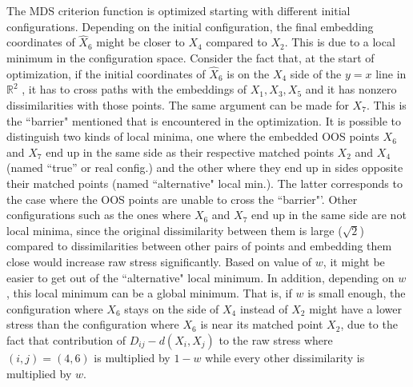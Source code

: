 \documentclass[12pt,oneside,final]{thesis}\usepackage[]{graphicx}\usepackage[]{color}
\begin{document}
The MDS criterion function is optimized starting with different initial configurations.   Depending on the initial configuration, the final embedding coordinates of $\hat{X}_6$ might be closer
to $X_4$ compared to $X_2$. This is due to a local minimum in the configuration space. Consider the fact that, at the start of optimization, if  the initial coordinates of $\hat{X}_6$ is on the $X_4$ side of the $y=x$ line  in  $\mathbb{R}^2$ , 
it has to cross paths with the embeddings of  ${X}_1,{X}_3,{X}_5$ and it has   nonzero dissimilarities with those points. The same argument can be made for $X_7$. This is  the ``barrier" mentioned that is encountered in the optimization. It is possible to distinguish two kinds of local minima, one where the embedded OOS points $X_6$ and $X_7$ end up in the same side as their respective matched points $X_2$ and $X_4$ (named ``true'' or real config.) and the other where they end up in sides  opposite their matched points (named ``alternative" local min.). The latter corresponds to the case where the OOS points are unable to cross the ``barrier"'. Other configurations such as the ones where $X_6$ and $X_7$  end up in the same side are not local minima, since the original dissimilarity between them is large ($\sqrt{2}$) compared to dissimilarities between other pairs of points and embedding them close would increase raw stress significantly.
Based on value of $w$, it might be easier to get out of the  ``alternative" local minimum. 
In addition, depending on $w$ , this  local minimum can be a global minimum. 
That is, if $w$ is small enough, the configuration where $X_6$ stays on the side of $X_4$ instead of $X_2$ might have a lower stress than the configuration where $X_6$ is near its matched point $X_2$, due to the fact that  contribution of $ D_{ij}-d(X_i,X_j)$ to the raw stress where $(i,j)=(4,6)$  is  multiplied by $1-w$ while every other dissimilarity is multiplied by $w$. 
\end{document}
